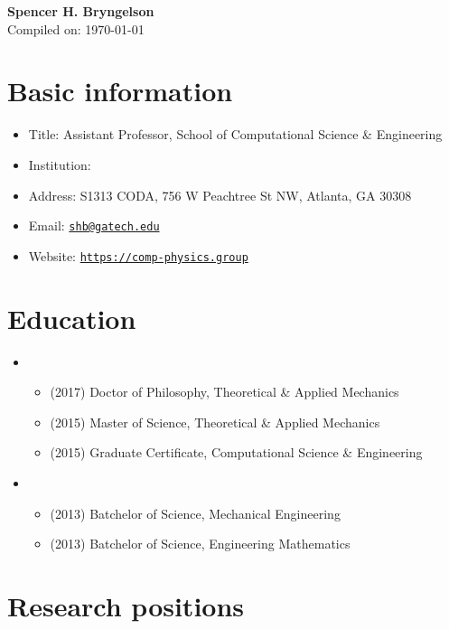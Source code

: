 



\begin{center}
    {\LARGE \bf Spencer H. Bryngelson} \\
    \medskip
    Compiled on: \today
\end{center}

\section{Basic information}
\begin{itemize}
    \item Title: Assistant Professor, School of Computational Science \& Engineering
    \item Institution: \GIT
    \item Address: S1313 CODA, 756 W Peachtree St NW, Atlanta, GA 30308
    \item Email: \href{mailto:shb@gatech.edu}{\texttt{shb@gatech.edu}}
    \item Website: \href{https://comp-physics.group}{\texttt{https://comp-physics.group}}
\end{itemize}

\section{Education}

\begin{itemize}
    \item \UIUC
    \begin{itemize}
        \item (2017) Doctor of Philosophy, Theoretical \& Applied Mechanics
        \item (2015) Master of Science, Theoretical \& Applied Mechanics
        \item (2015) Graduate Certificate, Computational Science \& Engineering
    \end{itemize}
    \item \UMD
    \begin{itemize}
        \item (2013) Batchelor of Science, Mechanical Engineering
        \item (2013) Batchelor of Science, Engineering Mathematics
    \end{itemize}
\end{itemize}


\section{Research positions}

